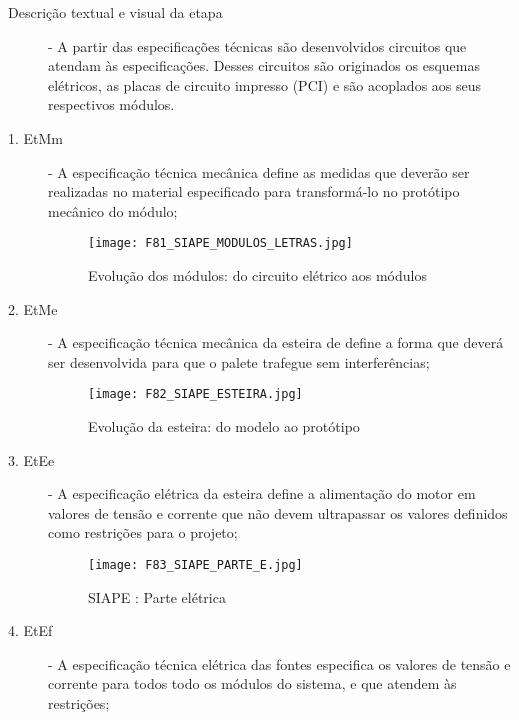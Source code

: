 	\begin{description}
		
		\item[Descrição textual e visual da etapa] - A partir das especificações técnicas são desenvolvidos circuitos que atendam às especificações. Desses circuitos são originados os esquemas elétricos, as placas de circuito impresso (PCI) e são acoplados aos seus respectivos módulos. \par 
		
		
		\item[1. EtMm] - A especificação técnica mecânica define as medidas que deverão ser realizadas no material especificado para transformá-lo no protótipo mecânico do módulo;\par 
		
		  \begin{figure}[!h]
		  	\centering
		  	\texttt{[image: F81\_SIAPE\_MODULOS\_LETRAS.jpg]} 
		  	\caption{Evolução dos módulos: do circuito elétrico aos módulos}
		  	\label{F81}
		  \end{figure}
				
		\item[2. EtMe] - A especificação técnica mecânica da esteira de define a forma que deverá ser desenvolvida para que o palete trafegue sem interferências; \par 	
	
	 \begin{figure}[!h]
	 	\centering
	 	\texttt{[image: F82\_SIAPE\_ESTEIRA.jpg]} 
	 	\caption{Evolução da esteira: do modelo ao protótipo}
	 	\label{F82}
	 \end{figure}
	
		\item[3. EtEe] - A especificação elétrica da esteira define a alimentação do motor em valores de tensão e corrente que não devem ultrapassar os valores definidos como restrições para o projeto;
		 
		 \begin{figure}[!h]
		 	\centering
		 	\texttt{[image: F83\_SIAPE\_PARTE\_E.jpg]} 
		 	\caption{SIAPE : Parte elétrica}
		 	\label{F83}
		 \end{figure}				
		
		\item[4. EtEf] - A especificação técnica elétrica das fontes especifica os valores de tensão e corrente para todos todo os módulos do sistema, e que atendem às restrições;
			 

\end{description}
